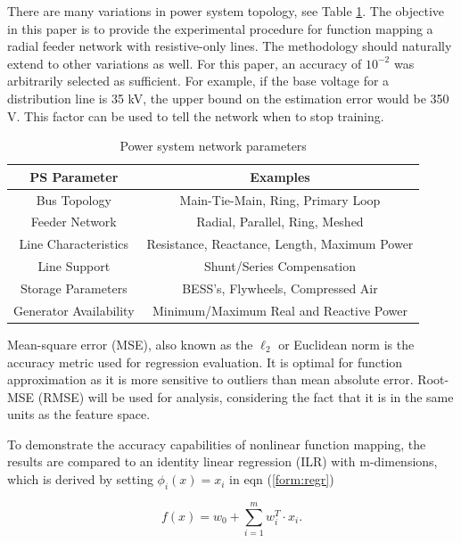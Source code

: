 \documentclass[conference]{IEEEtran}
\begin{document}
There are many variations in power system topology, see Table \ref{table:sim model}. The objective in this paper is to provide the experimental procedure for function mapping a radial feeder network with resistive-only lines. The methodology should naturally extend to other variations as well. For this paper, an accuracy of $10^{-2}$ was arbitrarily selected as sufficient. For example, if the base voltage for a distribution line is 35 kV, the upper bound on the estimation error would be 350 V. This factor can be used to tell the network when to stop training.

\begin{table}[h]
\centering
 \begin{tabular}{|c c|} 
  \hline
PS Parameter & Examples \\ %
 \hline\hline
Bus Topology & Main-Tie-Main, Ring, Primary Loop \\
 \hline
Feeder Network & Radial, Parallel, Ring, Meshed  \\ 
 \hline
Line Characteristics & Resistance, Reactance, Length, Maximum Power  \\
\hline
Line Support & Shunt/Series Compensation \\
\hline
Storage Parameters & BESS's, Flywheels, Compressed Air \\
\hline
Generator Availability & Minimum/Maximum Real and Reactive Power \\
\hline
\end{tabular} \vspace{1mm}
\caption[Power system network parameters]{Power system network parameters}
\label{table:sim model}
\end{table}
\vspace{-1.5em}

Mean-square error (MSE), also known as the $\ell_{2}$ or Euclidean norm is the accuracy metric used for regression evaluation. It is optimal for function approximation as it is more sensitive to outliers than mean absolute error. Root-MSE (RMSE) will be used for analysis, considering the fact that it is in the same units as the feature space.

To demonstrate the accuracy capabilities of nonlinear function mapping, the results are compared to an identity linear regression (ILR) with m-dimensions, which is derived by setting $\phi_{i}(x) = x_{i}$ in eqn (\ref{form:regr})

\begin{equation} f(x) = w_{0} + \sum_{i =1}^{m}w_{i}^{T} \cdot x_{i}. \label{form: idnregr} \end{equation}
\end{document}
